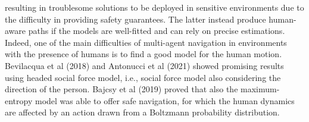 resulting in troublesome solutions to be deployed in sensitive environments due
to the difficulty in providing safety guarantees. The latter instead produce
human-aware paths if the models are well-fitted and can rely on precise
estimations. Indeed, one of the main difficulties of multi-agent navigation in
environments with the presence of humans is to find a good model for the human
motion. Bevilacqua et al (2018) and Antonucci et al (2021) showed promising
results using headed social force model, i.e., social force model also
considering the direction of the person. Bajcsy et al (2019) proved that also
the maximum-entropy model was able to offer safe navigation, for which the
human dynamics are affected by an action drawn from a Boltzmann probability
distribution.

